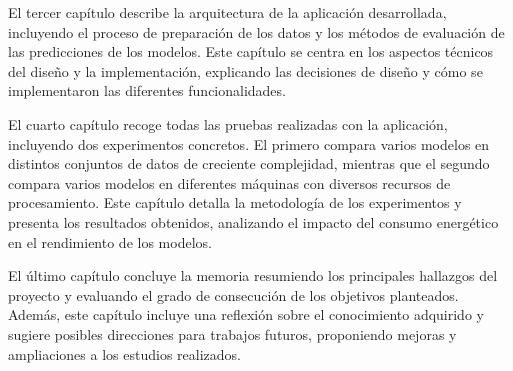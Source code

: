 El tercer capítulo describe la arquitectura de la aplicación desarrollada, incluyendo el proceso de preparación de los datos y los métodos de evaluación de las predicciones de los modelos. Este capítulo se centra en los aspectos técnicos del diseño y la implementación, explicando las decisiones de diseño y cómo se implementaron las diferentes funcionalidades.

El cuarto capítulo recoge todas las pruebas realizadas con la aplicación, incluyendo dos experimentos concretos. El primero compara varios modelos en distintos conjuntos de datos de creciente complejidad, mientras que el segundo compara varios modelos en diferentes máquinas con diversos recursos de procesamiento. Este capítulo detalla la metodología de los experimentos y presenta los resultados obtenidos, analizando el impacto del consumo energético en el rendimiento de los modelos.

El último capítulo concluye la memoria resumiendo los principales hallazgos del proyecto y evaluando el grado de consecución de los objetivos planteados. Además, este capítulo incluye una reflexión sobre el conocimiento adquirido y sugiere posibles direcciones para trabajos futuros, proponiendo mejoras y ampliaciones a los estudios realizados.

